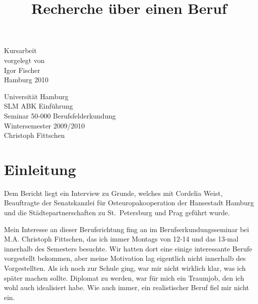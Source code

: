 \documentclass[12pt,headsepline,a4paper]{scrartcl}
\title{}
\author{}
\begin{document}
\begin{titlepage}
\date{}

\title{\Large Recherche über einen Beruf}
{\let\newpage\relax\maketitle}

\begin{center}
\vfill
Kursarbeit\\
vorgelegt von\\
Igor Fischer \\
\null
Hamburg 2010
\vfill
\end{center}
\begin{minipage}{0.5\textwidth}
\begin{flushleft} 
Universität Hamburg\\
SLM ABK Einführung\\
Seminar 50-000 Berufsfelderkundung\\
Wintersemester 2009/2010\\
Christoph Fittschen\\

\end{flushleft}
\end{minipage}
\vline
\begin{minipage}{0.5\textwidth}
\begin{flushright}
\end{flushright}

\end{minipage}

\end{titlepage}

\tableofcontents
\thispagestyle{empty}

\section{Einleitung}
Dem Bericht liegt ein Interview zu Grunde, welches mit Cordelia Weist, Beauftragte der Senatskanzlei für Osteuropakooperation der Hansestadt Hamburg und die Städtepartnerschaften zu St.\ Petersburg und Prag geführt wurde.

Mein Interesse an dieser Berufsrichtung fing an im Berufserkundungsseminar bei M.A. Christoph Fittschen, das ich immer Montags von 12-14 und das 13-mal innerhalb des Semesters besuchte. Wir hatten dort eine einige interessante Berufe vorgestellt bekommen, aber meine Motivation lag eigentlich nicht innerhalb des Vorgestellten.
Als ich noch zur Schule ging, war mir nicht wirklich klar, was ich später machen sollte. Diplomat zu werden, war für mich ein Traumjob, den ich wohl auch idealisiert habe. Wie auch immer, ein realistischer Beruf fiel mir nicht ein. 
\end{document}
